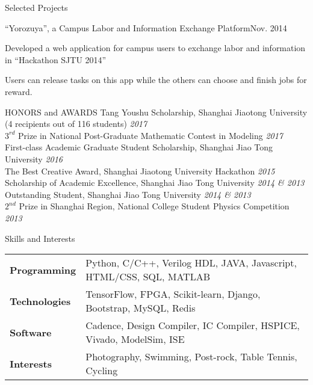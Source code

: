 \documentclass{resume_ucla} %
\begin{document}
\begin{rSection}{Selected Projects}
\begin{rSubsection}{``Yorozuya'', a Campus Labor and Information Exchange Platform}{Nov. 2014}{}{}
\item Developed a web application for campus users to exchange labor and information in ``Hackathon SJTU 2014'' 
\item Users can release tasks on this app while the others can choose and finish jobs for reward.
\end{rSubsection}

\end{rSection}


\begin{rSection}{HONORS and AWARDS}
Tang Youshu Scholarship, Shanghai Jiaotong University (4 recipients out of 116 students) \hfill \emph{2017}
\\$3^{rd}$ Prize in National Post-Graduate Mathematic Contest in Modeling \hfill \emph{2017}
\\First-class Academic Graduate Student Scholarship, Shanghai Jiao Tong University  \hfill \emph{2016}
\\The Best Creative Award, Shanghai Jiaotong University Hackathon \hfill \emph{2015}
\\Scholarship of Academic Excellence, Shanghai Jiao Tong University \hfill \emph{2014 \& 2013}
\\Outstanding Student, Shanghai Jiao Tong University \hfill \emph{2014 \& 2013}
\\$2^{nd}$ Prize in Shanghai Region, National College Student Physics Competition \hfill \emph{2013}
\end{rSection}

\begin{rSection}{Skills and Interests}
\begin{tabular}{ll}
\textbf{Programming} & Python, C/C++, Verilog HDL, JAVA, Javascript, HTML/CSS, SQL, MATLAB\\
\textbf{Technologies} & TensorFlow, FPGA, Scikit-learn, Django, Bootstrap, MySQL, Redis\\
\textbf{Software} & Cadence, Design Compiler, IC Compiler, HSPICE, Vivado, ModelSim, ISE\\
\textbf{Interests} & Photography, Swimming, Post-rock, Table Tennis, Cycling\\
\end{tabular}
\end{rSection}




\end{document}

